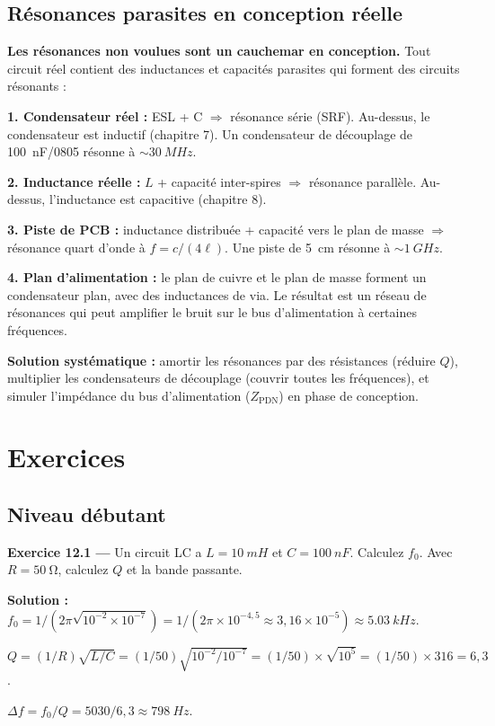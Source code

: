 \documentclass[12pt,a4paper,twoside]{book}
\begin{document}
\subsection{Résonances parasites en conception réelle}

\begin{attention}
\textbf{Les résonances non voulues sont un cauchemar en conception.} Tout circuit réel contient des inductances et capacités parasites qui forment des circuits résonants :

\textbf{1. Condensateur réel :} ESL + C $\Rightarrow$ résonance série (SRF). Au-dessus, le condensateur est inductif (chapitre 7). Un condensateur de découplage de \SI{100}{nF}/0805 résonne à $\sim\SI{30}{MHz}$.

\textbf{2. Inductance réelle :} $L$ + capacité inter-spires $\Rightarrow$ résonance parallèle. Au-dessus, l'inductance est capacitive (chapitre 8).

\textbf{3. Piste de PCB :} inductance distribuée + capacité vers le plan de masse $\Rightarrow$ résonance quart d'onde à $f = c/(4\ell)$. Une piste de \SI{5}{cm} résonne à $\sim\SI{1}{GHz}$.

\textbf{4. Plan d'alimentation :} le plan de cuivre et le plan de masse forment un condensateur plan, avec des inductances de via. Le résultat est un réseau de résonances qui peut amplifier le bruit sur le bus d'alimentation à certaines fréquences.

\textbf{Solution systématique :} amortir les résonances par des résistances (réduire $Q$), multiplier les condensateurs de découplage (couvrir toutes les fréquences), et simuler l'impédance du bus d'alimentation ($Z_{\text{PDN}}$) en phase de conception.
\end{attention}

\section*{Exercices}

\subsection*{Niveau débutant}

\textbf{Exercice 12.1 ---} Un circuit LC a $L = \SI{10}{mH}$ et $C = \SI{100}{nF}$. Calculez $f_0$. Avec $R = \SI{50}{\ohm}$, calculez $Q$ et la bande passante.

\begin{pratique}
\textbf{Solution :} $f_0 = 1/(2\pi\sqrt{10^{-2}\times10^{-7}}) = 1/(2\pi\times10^{-4{,}5} \approx 3{,}16\times10^{-5}) \approx \SI{5.03}{kHz}$.

$Q = (1/R)\sqrt{L/C} = (1/50)\sqrt{10^{-2}/10^{-7}} = (1/50)\times\sqrt{10^5} = (1/50)\times316 = 6{,}3$.

$\Delta f = f_0/Q = 5030/6{,}3 \approx \SI{798}{Hz}$.
\end{pratique}
\end{document}
